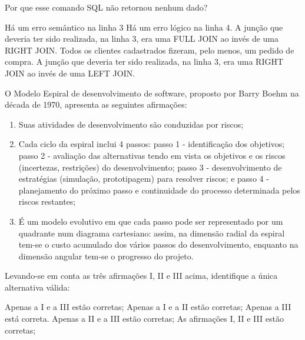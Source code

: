 \documentclass[12pt, addpoints]{exam}
\begin{document}
\begin{questions}
\begin{tcolorbox}
\begin{verbatim}
 \end{verbatim}

\end{tcolorbox}

Por que esse comando SQL não retornou nenhum dado?


\begin{choices}
\choice Há um erro semântico na linha 3
\choice Há um erro lógico na linha 4.
\choice A junção que deveria ter sido realizada, na linha 3, era uma FULL JOIN ao invés de uma RIGHT JOIN.
\choice Todos os clientes cadastrados fizeram, pelo menos, um pedido de compra.
\choice A junção que deveria ter sido realizada, na linha 3, era uma RIGHT JOIN ao invés de uma LEFT JOIN.
\end{choices}

\question

O Modelo Espiral de desenvolvimento de software, proposto por Barry Boehm na década de 1970, apresenta as seguintes afirmações:

\begin{enumerate}[label=\Roman*.]

    \item Suas atividades de desenvolvimento são conduzidas por riscos;

    \item Cada ciclo da espiral inclui 4 passos: passo 1 - identificação dos objetivos; passo 2 - avaliação das alternativas tendo em vista os objetivos e os riscos (incertezas, restrições) do desenvolvimento; passo 3 - desenvolvimento de estratégias (simulação, prototipagem) para resolver riscos; e passo 4 - planejamento do próximo passo e continuidade do processo determinada pelos riscos restantes;

    \item É um modelo evolutivo em que cada passo pode ser representado por um quadrante num diagrama cartesiano: assim, na dimensão radial da espiral tem-se o custo acumulado dos vários passos do desenvolvimento, enquanto na dimensão angular tem-se o progresso do projeto.

\end{enumerate}

Levando-se em conta as três afirmações I, II e III acima, identifique a única alternativa válida:


\begin{choices}
\choice Apenas a I e a III estão corretas;
\choice Apenas a I e a II estão corretas;
\choice Apenas a III está correta.
\choice Apenas a II e a III estão corretas;
\choice As afirmações I, II e III estão corretas;
\end{choices}


\end{questions}
\end{document}
